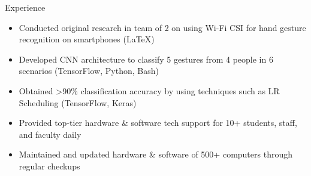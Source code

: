 \documentclass{resume} %
\begin{document}
\begin{workSection}{Experience}
    \experienceItem[
    company=Temple University,
    location=Philadelphia{,} PA,
    position=Undergraduate Researcher,
    duration=June – July 2023
    ]
    \begin{itemize}
        \itemsep -6pt {}
        \item Conducted original research in team of 2 on using Wi-Fi CSI for hand gesture recognition on smartphones (LaTeX)
        \item Developed CNN architecture to classify 5 gestures from 4 people in 6 scenarios (TensorFlow, Python, Bash)
        \item Obtained >90\% classification accuracy by using techniques such as LR Scheduling (TensorFlow, Keras)
    \end{itemize}

    \experienceItem[
    company=UTEP,
    location=El Paso{,} TX,
    position=Computer Lab Assistant,
    duration=January {-} May 2023
    ]
    \begin{itemize}
        \itemsep -6pt {}
        \item Provided top-tier hardware \& software tech support for 10+ students, staff, and faculty daily
        \item Maintained and updated hardware \& software of 500+ computers through regular checkups
    \end{itemize}

\end{workSection}
\end{document}
